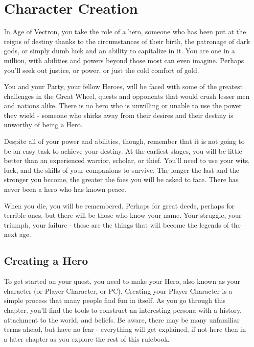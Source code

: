 \documentclass[10pt,twoside,openany]{book}
\begin{document}
\chapter{Character Creation}
\begin{multicols}{2}

	In Age of Vectron, you take the role of a hero, someone who has
	been put at the reigns of destiny thanks to the circumstances of their
	birth, the patronage of dark gods, or simply dumb luck and an ability to
	capitalize in it. You are one in a million, with abilities and powers
	beyond those most can even imagine. Perhaps you'll seek out justice, or
	power, or just the cold comfort of gold.

	You and your Party, your fellow Heroes, will be faced with some
	of the greatest challenges in the Great Wheel, quests and opponents that
	would crush lesser men and nations alike. There is no hero who is
	unwilling or unable to use the power they wield - someone who shirks away
	from their desires and their destiny is unworthy of being a Hero.

	Despite all of your power and abilities, though, remember that
	it is not going to be an easy task to achieve your destiny. At the
	earliest stages, you will be little better than an experienced warrior,
	scholar, or thief. You'll need to use your wits, luck, and the skills of
	your companions to survive. The longer the last and the stronger you
	become, the greater the foes you will be asked to face. There has never
	been a hero who has known peace.

	When you die, you will be remembered. Perhaps for great deeds,
	perhaps for terrible ones, but there will be those who know your name.
	Your struggle, your triumph, your failure - these are the things that will
	become the legends of the next age.

	\section{Creating a Hero}

		To get started on your quest, you need to make your Hero,
		also known as your character (or Player Character, or PC). Creating
		your Player Character is a simple process that many people find fun in
		itself. As you go through this chapter, you'll find the tools to
		construct an interesting persona with a history, attachment to the
		world, and beliefs. Be aware, there may be many unfamiliar terms
		ahead, but have no fear - everything will get explained, if not here
		then in a later chapter as you explore the rest of this rulebook.


\end{multicols}
\end{document}
